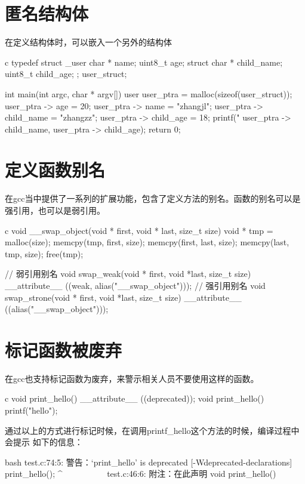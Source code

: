\section{匿名结构体}
在定义结构体时，可以嵌入一个另外的结构体
\begin{code-block}{c}
typedef struct _user {
    char * name;
    uint8_t age;
    struct {
        char * child_name;
        uint8_t child_age;
    };
}user_struct;

int main(int argc, char * argv[])
{
    user user_ptra = malloc(sizeof(user_struct));
    user_ptra -> age = 20;
    user_ptra -> name = "zhangjl";
    user_ptra -> child_name = "zhangzz";
    user_ptra -> child_age = 18;
    printf("%
           user_ptra -> child_name, user_ptra -> child_age);
    return 0;
}
\end{code-block}

\section{定义函数别名}
在gcc当中提供了一系列的扩展功能，包含了定义方法的别名。函数的别名可以是强引用，也可以是弱引用。
\begin{code-block}{c}
void __swap_object(void * first, void * last, size_t size)
{
    void * tmp = malloc(size);
    memcpy(tmp, first, size);
    memcpy(first, last, size);
    memcpy(last, tmp, size);
    free(tmp);
}

// 弱引用别名
void swap_weak(void * first, void *last, size_t size)
        __attribute__ ((weak, alias("__swap_object")));
// 强引用别名
void swap_strone(void * first, void *last, size_t size)
        __attribute__ ((alias("__swap_object")));
\end{code-block}

\section{标记函数被废弃}
在gcc也支持标记函数为废弃，来警示相关人员不要使用这样的函数。
\begin{code-block}{c}
void print_hello() __attribute__ ((deprecated));
void print_hello()
{
    printf("hello\n");
}
\end{code-block}

通过以上的方式进行标记时候，在调用printf\_hello这个方法的时候，编译过程中会提示
如下的信息：
\begin{code-block}{bash}
test.c:74:5: 警告：‘print_hello’ is deprecated [-Wdeprecated-declarations]
     print_hello();
     ^~~~~~~~~~~
test.c:46:6: 附注：在此声明
 void print_hello()
\end{code-block}

